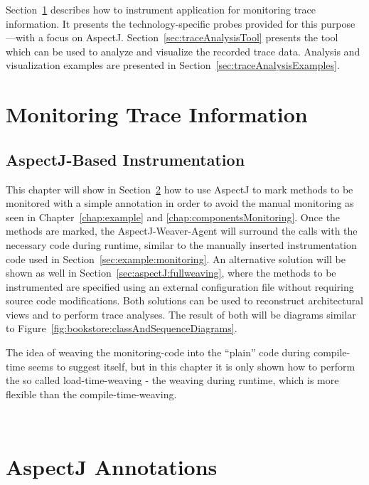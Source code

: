 \noindent Section~\ref{sec:traceMonitoring} describes how to instrument application for %
monitoring trace information. %
It presents the technology-specific probes provided for this purpose---with %
a focus on AspectJ. Section~\ref{sec:traceAnalysisTool} presents the %
tool which can be used to analyze and visualize the recorded trace %
data. Analysis and visualization examples are presented in Section~\ref{sec:traceAnalysisExamples}.

\section{Monitoring Trace Information}\label{sec:traceMonitoring}

\subsection{AspectJ-Based Instrumentation}

This chapter will show in Section~\ref{sec:aspectJ:annotation} how
to use AspectJ to mark methods to be monitored with a simple annotation
in order to avoid the manual monitoring as seen in Chapter~\ref{chap:example}
and \ref{chap:componentsMonitoring}. Once the methods are marked, the AspectJ-Weaver-Agent
will surround the calls with the necessary code during runtime, similar
to the manually inserted instrumentation code used in Section~\ref{sec:example:monitoring}.
An alternative solution will be shown as well in Section~\ref{sec:aspectJ:fullweaving}, %
where the methods to be instrumented are specified using an external configuration file %
without requiring source code modifications. Both solutions
can be used to reconstruct architectural views and to perform trace
analyses. The result of both will be diagrams similar to Figure~\ref{fig:bookstore:classAndSequenceDiagrams}.

The idea of weaving the monitoring-code into the ``plain'' code
during compile-time seems to suggest itself, but in this chapter it
is only shown how to perform the so called load-time-weaving - the
weaving during runtime, which is more flexible than the compile-time-weaving.

\



\section{AspectJ Annotations}\label{sec:aspectJ:annotation}

